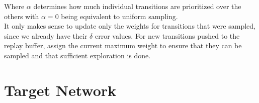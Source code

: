 Where $\alpha$ determines how much individual transitions are prioritized over the others with $\alpha = 0$ being equivalent to uniform sampling.\\

It only makes sense to update only the weights for transitions that were sampled, since we already have their $\delta$ error values\cite{lecture_dqn}. For new transitions pushed to the replay buffer, assign the current maximum weight to ensure that they can be sampled and that sufficient exploration is done.


\section{Target Network }

